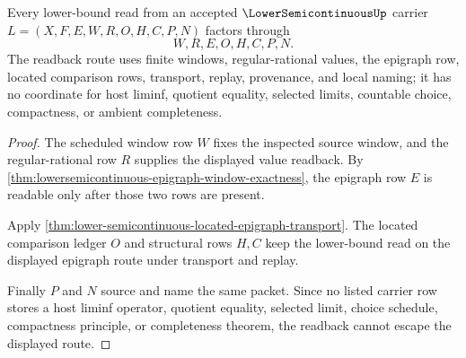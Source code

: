 \begin{theorem}
\label{thm:lower-semicontinuous-regular-readback-nonescape}
Every lower-bound read from an accepted $\LowerSemicontinuousUp$ carrier
$L=(X,F,E,W,R,O,H,C,P,N)$ factors through
$$
W,R,E,O,H,C,P,N .
$$
The readback route uses finite windows, regular-rational values, the epigraph
row, located comparison rows, transport, replay, provenance, and local naming;
it has no coordinate for host liminf, quotient equality, selected limits,
countable choice, compactness, or ambient completeness.
\end{theorem}
\begin{proof}
The scheduled window row $W$ fixes the inspected source window, and the
regular-rational row $R$ supplies the displayed value readback. By
\autoref{thm:lowersemicontinuous-epigraph-window-exactness}, the epigraph row
$E$ is readable only after those two rows are present.

Apply \autoref{thm:lower-semicontinuous-located-epigraph-transport}. The
located comparison ledger $O$ and structural rows $H,C$ keep the lower-bound
read on the displayed epigraph route under transport and replay.

Finally $P$ and $N$ source and name the same packet. Since no listed carrier
row stores a host liminf operator, quotient equality, selected limit, choice
schedule, compactness principle, or completeness theorem, the readback cannot
escape the displayed route.
\end{proof}

